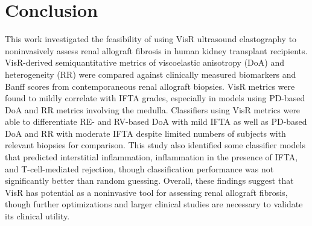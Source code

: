 \section{Conclusion}


This work investigated the feasibility of using VisR ultrasound elastography to noninvasively assess renal allograft fibrosis in human kidney transplant recipients. VisR-derived semiquantitative metrics of viscoelastic anisotropy (DoA) and heterogeneity (RR) were compared against clinically measured biomarkers and Banff scores from contemporaneous renal allograft biopsies. VisR metrics were found to mildly correlate with IFTA grades, especially in models using PD-based DoA and RR metrics involving the medulla. Classifiers using VisR metrics were able to differentiate RE- and RV-based DoA with mild IFTA as well as PD-based DoA and RR with moderate IFTA despite limited numbers of subjects with relevant biopsies for comparison. This study also identified some classifier models that predicted interstitial inflammation, inflammation in the presence of IFTA, and T-cell-mediated rejection, though classification performance was not significantly better than random guessing. Overall, these findings suggest that VisR has potential as a noninvasive tool for assessing renal allograft fibrosis, though further optimizations and larger clinical studies are necessary to validate its clinical utility.
